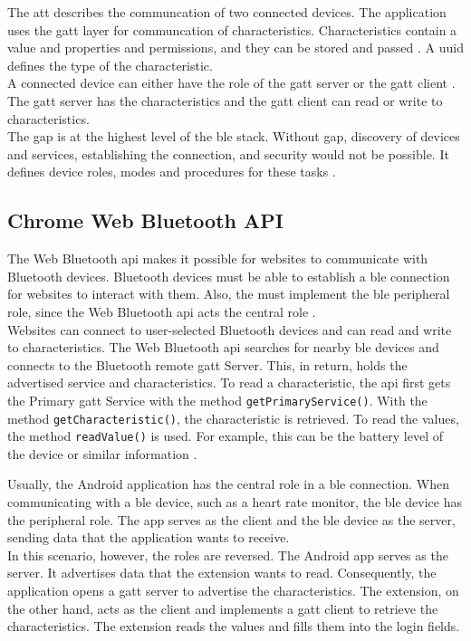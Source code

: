 The \gls{att} describes the communcation of two connected devices. The application uses the \gls{gatt} layer for communcation of characteristics. Characteristics contain a value and properties and permissions, and they can be stored and passed \cite{BTGatt}. A \gls{uuid} defines the type of the characteristic. \\
A connected device can either have the role of the \gls{gatt} server or the \gls{gatt} client \cite{TIGatt}. The \gls{gatt} server has the characteristics and the \gls{gatt} client can read or write to characteristics. \\
The \gls{gap} is at the highest level of the \gls{ble} stack. Without \gls{gap}, discovery of devices and services, establishing the connection, and security would not be possible. It defines device roles, modes and procedures for these tasks \cite{DBLP:journals/sensors/GomezOP12}.


\subsection*{Chrome Web Bluetooth API}
The Web Bluetooth \gls{api} makes it possible for websites to communicate with Bluetooth devices. Bluetooth devices must be able to establish a \gls{ble} connection for websites to interact with them. Also, the must implement the \gls{ble} peripheral role, since the Web Bluetooth \gls{api} acts the central role \cite{BTAPIMozilla}. \\
Websites can connect to user-selected Bluetooth devices and can read and write to characteristics. The Web Bluetooth \gls{api} searches for nearby \gls{ble} devices and connects to the Bluetooth remote \gls{gatt} Server. This, in return, holds the advertised service and characteristics. To read a characteristic, the \gls{api} first gets the Primary \gls{gatt} Service with the method \texttt{getPrimaryService()}. With the method \texttt{getCharacteristic()}, the characteristic is retrieved. To read the values, the method \texttt{readValue()} is used. For example, this can be the battery level of the device or similar information \cite{WebBTAPI}.

Usually, the Android application has the central role in a \gls{ble} connection. When communicating with a \gls{ble} device, such as a heart rate monitor, the \gls{ble} device has the peripheral role. The app serves as the client and the \gls{ble} device as the server, sending data that the application wants to receive. \\
In this scenario, however, the roles are reversed. The Android app serves as the server. It advertises data that the extension wants to read. Consequently, the application opens a \gls{gatt} server to advertise the characteristics. The extension, on the other hand, acts as the client and implements a \gls{gatt} client to retrieve the characteristics. The extension reads the values and fills them into the login fields. \\